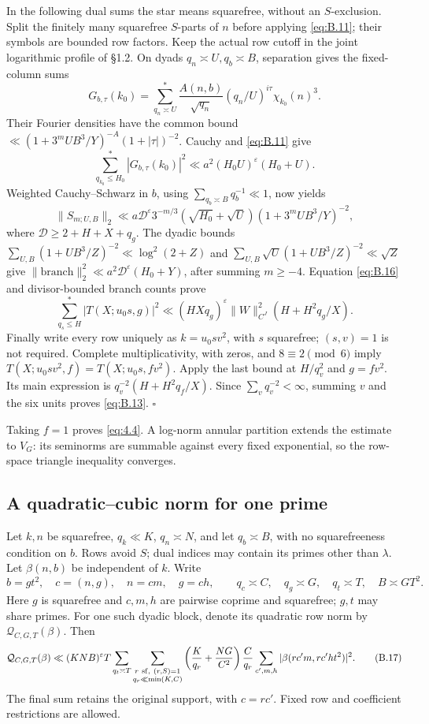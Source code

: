 \documentclass[11pt,a4paper]{article}
\begin{document}
In the following dual sums the star means squarefree, without an \(S\)-exclusion. Split the finitely many squarefree \(S\)-parts of \(n\) before applying \eqref{eq:B.11}; their symbols are bounded row factors. Keep the actual row cutoff in the joint logarithmic profile of §1.2. On dyads \(q_n\asymp U,q_b\asymp B\), separation gives the fixed-column sums \[
G_{b,\tau}(k_0)=\sum_{q_n\asymp U}^{*}
\frac{A(n,b)}{\sqrt{q_n}}(q_n/U)^{i\tau}\chi_{k_0}(n)^3.
\] Their Fourier densities have the common bound \(\ll(1+3^mUB^3/Y)^{-A}(1+|\tau|)^{-2}\). Cauchy and \eqref{eq:B.11} give \[
\sum_{q_{k_0}\le H_0}^{*}|G_{b,\tau}(k_0)|^2
\ll a^2(H_0U)^\varepsilon(H_0+U).
\] Weighted Cauchy--Schwarz in \(b\), using \(\sum_{q_b\asymp B}q_b^{-1}\ll1\), now yields \[
\|S_{m;U,B}\|_2
\ll a\mathcal D^\varepsilon3^{-m/3}(\sqrt{H_0}+\sqrt U)
(1+3^mUB^3/Y)^{-2},
\] where \(\mathcal D\ge2+H+X+q_g\). The dyadic bounds \(\sum_{U,B}(1+UB^3/Z)^{-2}\ll\log^2(2+Z)\) and \(\sum_{U,B}\sqrt U(1+UB^3/Z)^{-2}\ll\sqrt Z\) give \(\|\text{branch}\|_2^2\ll a^2\mathcal D^\varepsilon(H_0+Y)\), after summing \(m\ge-4\). Equation \eqref{eq:B.16} and divisor-bounded branch counts prove \[
\sum_{q_s\le H}^{*}|T(X;u_0s,g)|^2
\ll(HXq_g)^\varepsilon\|W\|_{C^J}^2
\left(H+H^2q_g/X\right).
\] Finally write every row uniquely as \(k=u_0sv^2\), with \(s\) squarefree; \((s,v)=1\) is not required. Complete multiplicativity, with zeros, and \(8\equiv2\pmod6\) imply \(T(X;u_0sv^2,f)=T(X;u_0s,fv^2)\). Apply the last bound at \(H/q_v^2\) and \(g=fv^2\). Its main expression is \(q_v^{-2}(H+H^2q_f/X)\). Since \(\sum_vq_v^{-2}<\infty\), summing \(v\) and the six units proves \eqref{eq:B.13}. \hfill\(\square\)

Taking \(f=1\) proves \eqref{eq:4.4}. A log-norm annular partition extends the estimate to \(V_G\): its seminorms are summable against every fixed exponential, so the row-space triangle inequality converges.

\subsection{A quadratic--cubic norm for one prime}\label{sec:B.3}

Let \(k,n\) be squarefree, \(q_k\ll K\), \(q_n\asymp N\), and let \(q_b\asymp B\), with no squarefreeness condition on \(b\). Rows avoid \(S\); dual indices may contain its primes other than \(\lambda\). Let \(\beta(n,b)\) be independent of \(k\). Write \[
b=gt^2,\quad c=(n,g),\quad n=cm,\quad g=ch,
\qquad q_c\asymp C,\quad q_g\asymp G,\quad q_t\asymp T,
\quad B\asymp GT^2.
\] Here \(g\) is squarefree and \(c,m,h\) are pairwise coprime and squarefree; \(g,t\) may share primes. For one such dyadic block, denote its quadratic row norm by \(\mathcal Q_{C,G,T}(\beta)\). Then \[
\mathcal Q_{C,G,T}(\beta)
\ll (KNB)^\varepsilon T
\sum_{q_t\asymp T}\sum_{\substack{r\ {\rm sf},\ (r,S)=1\\q_r\ll\min(K,C)}}
\left(\frac K{q_r}+\frac{NG}{C^2}\right)\frac C{q_r}
\sum_{c',m,h}|\beta(rc'm,rc'ht^2)|^2.
\tag{B.17}\label{eq:B.17}
\] The final sum retains the original support, with \(c=rc'\). Fixed row and coefficient restrictions are allowed.
\end{document}
